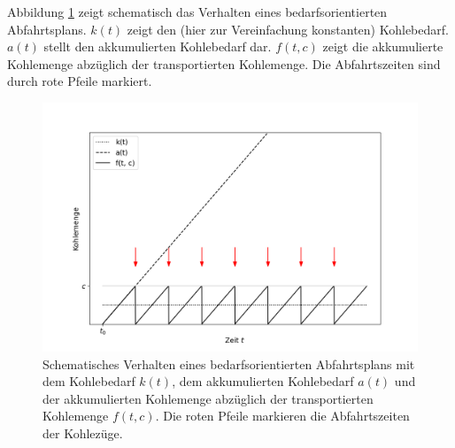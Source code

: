 Abbildung \ref{fig:demand-math} zeigt schematisch das Verhalten eines bedarfsorientierten Abfahrtsplans. $k(t)$ zeigt den (hier zur Vereinfachung konstanten) Kohlebedarf. $a(t)$ stellt den akkumulierten Kohlebedarf dar. $f(t,c)$ zeigt die akkumulierte Kohlemenge abzüglich der transportierten Kohlemenge. Die Abfahrtszeiten sind durch rote Pfeile markiert.

\begin{figure}[H]
	\centering
	\includegraphics[width=1.0\linewidth]{images/demand-math.png}
	\caption{Schematisches Verhalten eines bedarfsorientierten Abfahrtsplans mit dem Kohlebedarf $k(t)$, dem akkumulierten Kohlebedarf $a(t)$ und der akkumulierten Kohlemenge abzüglich der transportierten Kohlemenge $f(t,c)$. Die roten Pfeile markieren die Abfahrtszeiten der Kohlezüge.}
	\label{fig:demand-math}
\end{figure}